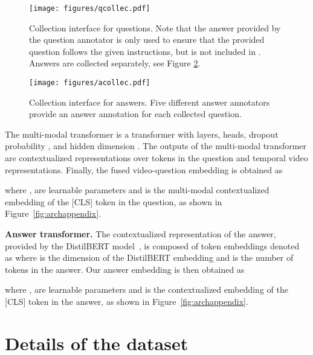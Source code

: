 \begin{figure*}[t]
\centering
\begin{subfigure}{0.95\textwidth}
\texttt{[image: figures/qcollec.pdf]}
\caption{Collection interface for questions. Note that the answer provided by the question annotator is only used to ensure that the provided question follows the given instructions, but is not included in \smalldatasetname{}. Answers are collected separately, see Figure \ref{fig:acollec}.}
\label{fig:qcollec}
\end{subfigure}
\begin{subfigure}{0.95\textwidth}
\texttt{[image: figures/acollec.pdf]}
\caption{Collection interface for answers. Five different answer annotators provide an answer annotation for each collected question.}
\label{fig:acollec}
\end{subfigure}
\vspace{-0.2cm}
\caption{Amazon Mechanical Turk interfaces for collecting questions (Figure \ref{fig:qcollec}) and answers (Figure \ref{fig:acollec}) for the \smalldatasetname{} dataset. For readability, the videos shown in these Figures are shrinked, and only one annotation example is shown.}
\vspace{-0.5cm}
\label{fig:collec}
\end{figure*}

The multi-modal transformer is a transformer with  layers,  heads, dropout probability , and hidden dimension . The outputs of the multi-modal transformer  are contextualized representations over tokens in the question and temporal video representations. Finally, the fused video-question embedding  is obtained as 

where ,  are learnable parameters and  is the multi-modal contextualized embedding of the [CLS] token in the question, as shown in Figure~\ref{fig:archappendix}.

\noindent \textbf{Answer transformer.} The contextualized representation of the answer, provided by the DistilBERT model~\cite{sanh2019distilbert}, is composed of  token embeddings denoted as  where  is the dimension of the DistilBERT embedding and  is the number of tokens in the answer. 
Our answer embedding  is then obtained as

where ,  are learnable parameters and  is the contextualized embedding of the [CLS] token in the answer, as shown in Figure~\ref{fig:archappendix}.



\section{Details of the \smalldatasetname{} dataset}
\label{sec:ivqadata}

